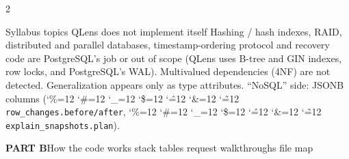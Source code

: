 \documentclass[10pt,a4paper]{article}
\newcommand{\code}{\begingroup\catcode`\%=12 \catcode`\#=12 \catcode`\_=12 \catcode`\$=12
  \catcode`\^=12 \catcode`\&=12 \catcode`\~=12 \codeinner}
\newcommand{\codeinner}[1]{\texttt{#1}\endgroup}
\newcommand{\parthead}[3]{%
  \begin{tcolorbox}[enhanced, colback=ink, colframe=ink, arc=1.6pt, boxrule=0pt, left=6pt, right=6pt,
    top=3pt, bottom=3pt, before skip=2pt, after skip=4pt]
  {\color{white}\bfseries\fontsize{11}{13}\selectfont #1\quad}{\color{white!80!ink}\fontsize{8.5}{10}\selectfont #2}%
  \hfill{\color{white!70!ink}\fontsize{7.5}{9}\selectfont #3}
  \end{tcolorbox}}
\begin{document}
\begin{multicols}{2}
\begin{topic}[muted]{Syllabus topics QLens does not implement itself}
Hashing / hash indexes, RAID, distributed and parallel databases, timestamp-ordering protocol and
recovery code are PostgreSQL's job or out of scope (QLens uses B-tree and GIN indexes, row locks, and
PostgreSQL's WAL). Multivalued dependencies (4NF) are not detected. Generalization appears only as type
attributes. ``NoSQL'' side: JSONB columns (\code{row_changes.before/after}, \code{explain_snapshots.plan}).
\end{topic}

\end{multicols}

\parthead{PART B}{How the code works}{stack \textperiodcentered{} tables \textperiodcentered{} request walkthroughs \textperiodcentered{} file map}
\end{document}
